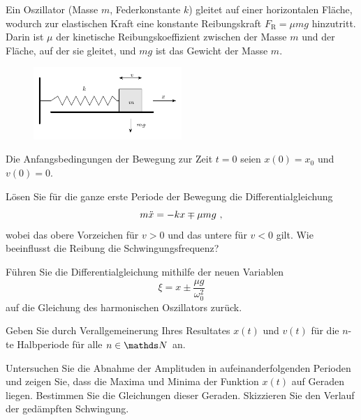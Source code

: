 \begin{atiTask}[
  title = Oszillator auf rauer Unterlage
]
  Ein Oszillator (Masse $m$, Federkonstante $k$) gleitet auf einer horizontalen Fläche, wodurch zur elastischen Kraft eine konstante Reibungskraft $F_\text{R} = \mu mg$ hinzutritt.
  Darin ist $\mu$ der kinetische Reibungskoeffizient zwischen der Masse $m$ und der Fläche, auf der sie gleitet, und $mg$ ist das Gewicht der Masse $m$.
  \begin{figure}[H]
    \center
    \includegraphics[width=0.5\textwidth]{task-oszillator_auf_rauer_unterlage-sketch.pdf}
  \end{figure}
  Die Anfangsbedingungen der Bewegung zur Zeit $t=0$ seien $x(0)=x_0$ und $v(0)=0$.
  \begin{atiSubtasks}
    \item{
      Lösen Sie für die ganze erste Periode der Bewegung die Differentialgleichung
      \[
        m \ddot{x} = -kx \mp \mu mg\ ,
      \]
      wobei das obere Vorzeichen für $v>0$ und das untere für $v<0$ gilt.
      Wie beeinflusst die Reibung die Schwingungsfrequenz?

      \begin{atiNote}
        Führen Sie die Differentialgleichung mithilfe der neuen Variablen
        \[
          \xi = x\pm \frac{\mu g}{\omega_0^2}
        \]
        auf die Gleichung des harmonischen Oszillators zurück.
      \end{atiNote}
    }
    \item{
      Geben Sie durch Verallgemeinerung Ihres Resultates $x(t)$ und $v(t)$ für die $n$-te Halbperiode für alle $n\in\setNatural$ an.
    }
    \item{
      Untersuchen Sie die Abnahme der Amplituden in aufeinanderfolgenden Perioden und zeigen Sie, dass die Maxima und Minima der Funktion $x(t)$ auf Geraden liegen.
      Bestimmen Sie die Gleichungen dieser Geraden.
      Skizzieren Sie den Verlauf der gedämpften Schwingung.
    }
  \end{atiSubtasks}
\end{atiTask}